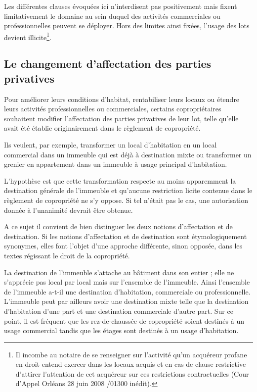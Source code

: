 				Les différentes clauses évoquées ici n'interdisent pas positivement mais fixent limitativement le domaine au sein duquel des activités commerciales ou professionnelles peuvent se déployer. Hors des limites ainsi fixées, l'usage des lots devient illicite\footnote{Il incombe au notaire de se renseigner sur l’activité qu’un acquéreur profane en droit entend exercer dans les locaux acquis et en cas de clause restrictive d’attirer l’attention de cet acquéreur sur ces restrictions contractuelles (Cour d'Appel Orléans 28 juin 2008 /01300 inédit).}.
		
	\subsection{Le changement d'affectation des parties privatives}\label{07_II_C}
			
		Pour améliorer leurs conditions d'habitat, rentabiliser leurs locaux ou étendre leurs activités professionnelles ou commerciales, certains copropriétaires souhaitent modifier l'affectation des parties privatives de leur lot, telle qu'elle avait été établie originairement dans le règlement de copropriété.
		
		Ils veulent, par exemple, transformer un local d'habitation en un local commercial dans un immeuble qui est déjà à destination mixte ou transformer un grenier en appartement dans un immeuble à usage principal d'habitation.
		
		L'hypothèse est que cette transformation respecte au moins apparemment la destination générale de l'immeuble et qu'aucune restriction licite contenue dans le règlement de copropriété ne s'y oppose. Si tel n'était pas le cas, une autorisation donnée à l'unanimité devrait être obtenue.
		
		A ce sujet il convient de bien distinguer les deux notions d’affectation et de destination. Si les notions d’affectation et de destination sont étymologiquement synonymes, elles font l’objet d’une approche différente, sinon opposée, dans les textes régissant le droit de la copropriété.
		
		La destination de l’immeuble s’attache au bâtiment dans son entier ; elle ne s’apprécie pas local par local mais sur l’ensemble de l’immeuble. Ainsi l’ensemble de l’immeuble a-t-il une destination d’habitation, commerciale ou professionnelle. L’immeuble peut par ailleurs avoir une destination mixte telle que la destination d’habitation d’une part et une destination commerciale d’autre part. Sur ce point, il est fréquent que les rez-de-chaussée de copropriété soient destinés à un usage commercial tandis que les étages sont destinés à un usage d’habitation.

